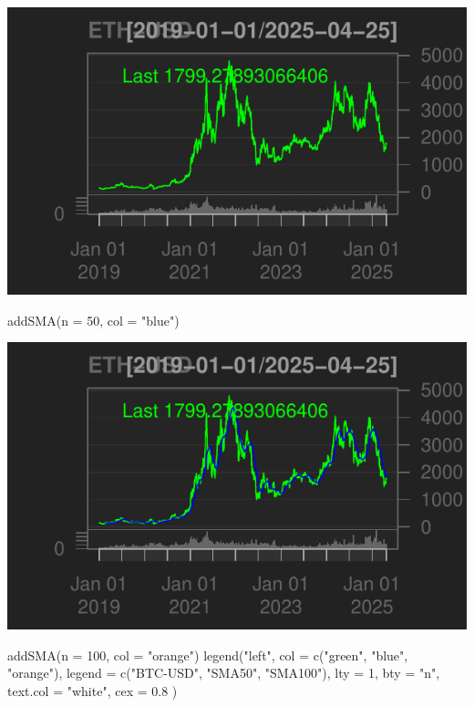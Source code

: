 \documentclass[]{tufte-handout}
\newenvironment{Shaded}{}{}
\newcommand{\AttributeTok}[1]{\textcolor[rgb]{0.49,0.56,0.16}{#1}}
\newcommand{\DecValTok}[1]{\textcolor[rgb]{0.25,0.63,0.44}{#1}}
\newcommand{\FloatTok}[1]{\textcolor[rgb]{0.25,0.63,0.44}{#1}}
\newcommand{\FunctionTok}[1]{\textcolor[rgb]{0.02,0.16,0.49}{#1}}
\newcommand{\NormalTok}[1]{#1}
\newcommand{\StringTok}[1]{\textcolor[rgb]{0.25,0.44,0.63}{#1}}
\begin{document}
\includegraphics{cripto_update_files/figure-latex/unnamed-chunk-6-1}

\begin{Shaded}
\begin{Highlighting}[]
\FunctionTok{addSMA}\NormalTok{(}\AttributeTok{n =} \DecValTok{50}\NormalTok{, }\AttributeTok{col =} \StringTok{"blue"}\NormalTok{)}
\end{Highlighting}
\end{Shaded}

\includegraphics{cripto_update_files/figure-latex/unnamed-chunk-6-2}

\begin{Shaded}
\begin{Highlighting}[]
\FunctionTok{addSMA}\NormalTok{(}\AttributeTok{n =} \DecValTok{100}\NormalTok{, }\AttributeTok{col =} \StringTok{"orange"}\NormalTok{)}
\FunctionTok{legend}\NormalTok{(}\StringTok{"left"}\NormalTok{,}
  \AttributeTok{col =} \FunctionTok{c}\NormalTok{(}\StringTok{"green"}\NormalTok{, }\StringTok{"blue"}\NormalTok{, }\StringTok{"orange"}\NormalTok{),}
  \AttributeTok{legend =} \FunctionTok{c}\NormalTok{(}\StringTok{"BTC{-}USD"}\NormalTok{, }\StringTok{"SMA50"}\NormalTok{, }\StringTok{"SMA100"}\NormalTok{), }\AttributeTok{lty =} \DecValTok{1}\NormalTok{, }\AttributeTok{bty =} \StringTok{"n"}\NormalTok{,}
  \AttributeTok{text.col =} \StringTok{"white"}\NormalTok{, }\AttributeTok{cex =} \FloatTok{0.8}
\NormalTok{)}
\end{Highlighting}
\end{Shaded}
\end{document}
